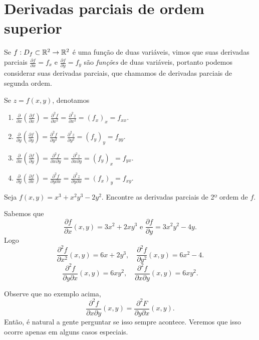 \section{Derivadas parciais de ordem superior}

Se \(f:D_f\subset \mathbb{R}^2 \to \mathbb{R}^2\) é uma função de duas variáveis, vimos que suas derivadas parciais \(\frac{\partial f}{\partial x} = f_x\) e \(\frac{\partial f}{\partial y} = f_y\) são \textit{funções} de duas variáveis, portanto podemos considerar suas derivadas parciais, que chamamos de derivadas parciais de segunda ordem.

Se \(z = f(x,y)\), denotamos
    \begin{enumerate}
        \item[i)] \(\frac{\partial}{\partial x} \left( \frac{\partial f}{\partial x} \right) = \frac{\partial^2 f}{\partial x^2} = \frac{\partial^2 z}{\partial x^2} = (f_x)_x = f_{xx}\).
        \item[ii)] \(\frac{\partial}{\partial y} \left( \frac{\partial f}{\partial y} \right) = \frac{\partial^2 f}{\partial y^2} = \frac{\partial^2 z}{\partial y^2} = (f_y)_y = f_{yy}\).
        \item[iii)] \(\frac{\partial}{\partial x} \left( \frac{\partial f}{\partial y} \right) = \frac{\partial^2 f}{\partial x \partial y} = \frac{\partial^2 z}{\partial x \partial y} = (f_y)_x = f_{yx}\).
        \item[iv)] \(\frac{\partial}{\partial y} \left( \frac{\partial f}{\partial x} \right) = \frac{\partial^2 f}{\partial y \partial x} = \frac{\partial^2 z}{\partial y \partial x} = (f_x)_y = f_{xy}\).    
    \end{enumerate}

\begin{example}
    Seja \(f(x,y) = x^3 + x^2 y^3 - 2y^2.\) Encontre as derivadas parciais de 2º ordem de \(f\).

    Sabemos que \[\frac{\partial f}{\partial x}(x,y) = 3x^2 + 2xy^3 \text{ e } \frac{\partial f}{\partial y} = 3x^2y^2 - 4y.\] Logo \[\frac{\partial^2 f}{\partial x^2}(x,y) = 6x + 2y^3 , \quad \frac{\partial^2 f}{\partial y^2}(x,y) = 6x^2 - 4.\] \[\frac{\partial^2 f}{\partial y \partial x}(x,y) = 6xy^2, \quad \frac{\partial^2 f}{\partial x \partial y}(x,y) = 6xy^2.\]
\end{example}

Observe que no exemplo acima, \[\frac{\partial^2 f}{\partial x \partial y}(x,y) = \frac{\partial^2 F}{\partial y \partial x}(x,y).\] Então, é natural a gente perguntar se isso sempre acontece. Veremos que isso ocorre apenas em alguns casos especiais.

